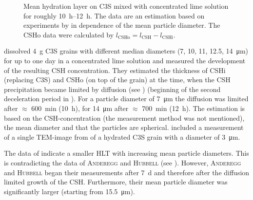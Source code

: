 \begin{figure}[htb]
    \caption{
        Mean hydration layer on \ac{C3S} mixed with concentrated lime solution for roughly \qtyrange{10}{12}{\hour}.
        The data are an estimation based on experiments by \textcite{garrault.2006} in dependence of the mean particle diameter.
        The \ac{CSHo} data were calculated by $l_{\text{CSHo}}=l_{\text{CSH}}-l_{\text{CSHi}}$.
    }
    \label{fig:garrault-distribution}
\end{figure}

\textcite{garrault.2006} dissolved \qty{4}{\gram} \ac{C3S} grains with different median diameters (7, 10, 11, 12.5, \qty{14}{\micro\meter}) for up to one day in a concentrated lime solution and measured the development of the resulting \ac{CSH} concentration.
They estimated the thickness of \ac{CSHi} (replacing \ac{C3S}) and \ac{CSHo} (on top of the grain) at the time, when the \ac{CSH} precipitation became limited by diffusion (see ) (beginning of the second deceleration period in ).
For a particle diameter of \qty{7}{\micro\meter} the diffusion was limited after $\approx$ \qty{600}{\minute} (\qty{10}{\hour}), for \qty{14}{\micro\meter} after $\approx$ \qty{700}{\minute} (\qty{12}{\hour}).
The estimation is based on the \ac{CSH}-concentration (the measurement method was not mentioned), the mean diameter and that the particles are spherical.
\textcite{garrault.2006} included a measurement of a single \ac{TEM}-image from  of a hydrated \ac{C3S} grain with a diameter of \qty{3}{\micro\meter}. %

The data of \textcite{garrault.2006} indicate a smaller \ac{HLT} with increasing mean particle diameters.
This is contradicting the data of \textsc{Anderegg} and \textsc{Hubbell} \cite{anderegg.1929,anderegg.1930} (see ).
However, \textsc{Anderegg} and \textsc{Hubbell} began their measurements after \qty{7}{\day} and therefore after the diffusion limited growth of the \ac{CSH}.
Furthermore, their mean particle diameter was significantly larger (starting from \qty{15.5}{\micro\meter}).


